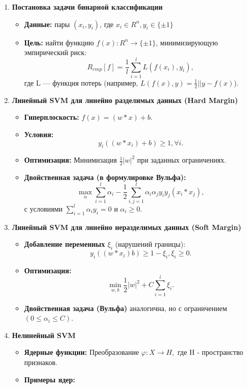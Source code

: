 \begin{enumerate}
    \item \textbf{Постановка задачи бинарной классификации}
    \begin{itemize}
        \item \textbf{Данные:} пары $(x_i, y_i)$, где $x_i \in R^n, y_i \in \{ \pm1 \}$
        \item \textbf{Цель:} найти функцию $f(x):R^n\to \{\pm1\}$, минимизирующую эмпирический риск:
        $$R_{emp}[f] = \frac{1}{l}\sum_{i=1}^lL(f(x_i),y_i),$$
        где L — функция потерь (например, $L(f(x),y)=\frac{1}{2}||y-f(x)$).
    \end{itemize}
    \item  \textbf{Линейный SVM для линейно разделимых данных (Hard Margin)}
    \begin{itemize}
        \item \textbf{Гиперплоскость:} $f(x)=(w*x)+b.$
        \item \textbf{Условия:} $$y_i((w*x_i)+b)\geq1, \forall i.$$
        \item \textbf{Оптимизация:} Минимизация $\frac{1}{2}|w|^2$ при заданных ограничениях.
        \item \textbf{Двойственная задача (в формулировке Вульфа):} $$
        \max_{\substack{\alpha}}\sum_{i=1}^l\alpha_i - \frac{1}{2}\sum_{i,j=1}^l\alpha_i\alpha_jy_iy_j(x_i*x_j),$$
        с условиями $\sum_{i=1}^l\alpha_iy_i=0$ и $\alpha_i\geq0.$
    \end{itemize}
    \item  \textbf{Линейный SVM для линейно неразделимых данных (Soft Margin)}
    \begin{itemize}
        \item \textbf{Добавление переменных $\xi_i$} (нарушений границы):$$y_i((w*x_i)b)\geq1-\xi_i, \xi_i \geq 0.$$
        \item \textbf{Оптимизация:} $$\min_{w,b}\frac{1}{2}|w|^2+C\sum_{i=1}^l\xi_i.$$
        \item \textbf{Двойственная задача (Вульфа)} аналогична, но с ограничением $(0 \leq \alpha_i \leq C).$
    \end{itemize}
    \item  \textbf{Нелинейный SVM}
    \begin{itemize}
        \item \textbf{Ядерные функции:} Преобразование $\varphi:X \to H,$ где H - пространство признаков.
        \item \textbf{Примеры ядер:}
        \begin{itemize}

\end{itemize}
\end{itemize}
\end{enumerate}
